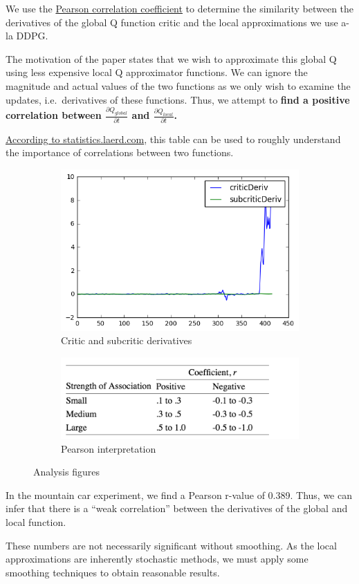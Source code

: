 We use the
\href{https://statistics.laerd.com/statistical-guides/pearson-correlation-coefficient-statistical-guide.php}{Pearson
correlation coefficient} to determine the similarity between the
derivatives of the global Q function critic and the local approximations
we use a-la DDPG.

The motivation of the paper states that we wish to approximate this
global Q using less expensive local Q approximator functions. We can
ignore the magnitude and actual values of the two functions as we only
wish to examine the updates, i.e.~derivatives of these functions. Thus,
we attempt to \textbf{find a positive correlation between
\(\frac{\partial Q_{global}}{\partial t}\) and
\(\frac{\partial Q_{local}}{\partial t}\).}

\href{https://statistics.laerd.com/statistical-guides/pearson-correlation-coefficient-statistical-guide.php}{According
to statistics.laerd.com}, this table can be used to roughly understand
the importance of correlations between two functions.

\begin{figure}[h]
\centering
\begin{subfigure}{.5\textwidth}
  \centering
  \includegraphics[width=.6\linewidth]{exp1_analysis_1_1.png}
  \caption{Critic and subcritic derivatives}
  \label{fig:sub1}
\end{subfigure}%
\begin{subfigure}{.5\textwidth}
  \centering
  \includegraphics[width=.6\linewidth]{pearson_table.png}
  \caption{Pearson interpretation}
  \label{fig:sub2}
\end{subfigure}
\caption{Analysis figures}
\label{fig:test}
\end{figure}

In the mountain car experiment, we find a Pearson r-value of
0.389. Thus, we can infer that there is a ``weak
correlation'' between the derivatives of the global and local function.

These numbers are not necessarily significant without smoothing. As the
local approximations are inherently stochastic methods, we must apply
some smoothing techniques to obtain reasonable results.